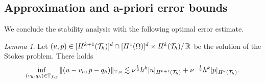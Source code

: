 \documentclass[pdflatex,sn-mathphys,Numbered]{sn-jnl}%
\theoremstyle{remark}%
\newtheorem{lemma}[theorem]{Lemma}
\theoremstyle{definition}%
\begin{document}
\subsection{Approximation and a-priori error bounds}

We conclude the stability analysis with the following optimal error estimate. 

\begin{lemma}
Let $(u,p) \in [H^{k+1}({\mathcal{T}_h})]^d\cap [H^1(\Omega)]^d \times H^{k}({\mathcal{T}_h})
/\, \mathbb{R}$ be the solution of the Stokes problem.
  There holds
  \begin{equation} \label{eq:approx}
    \inf_{(v_h,q_h) \in \mathbb{T}_{f,g}} \Vert (u-v_h,p-q_h) \Vert_{\mathbb{T},\ast} \lesssim
    \nu^{\frac12} h^{k} \vert  u \vert_{H^{k+1}({\mathcal{T}_h})} + \nu^{-\frac12} h^{k} \vert p \vert_{H^{k}({\mathcal{T}_h})}.
  \end{equation}
\end{lemma}
\end{document}
